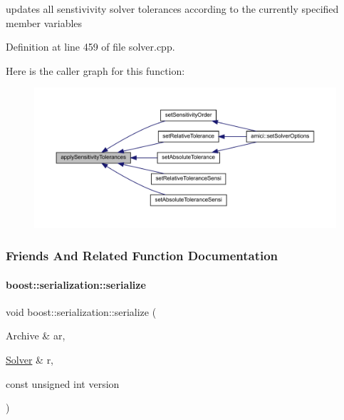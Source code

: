 updates all senstivivity solver tolerances according to the currently specified member variables 

Definition at line 459 of file solver.\+cpp.

Here is the caller graph for this function\+:
\nopagebreak
\begin{figure}[H]
\begin{center}
\leavevmode
\includegraphics[width=350pt]{classamici_1_1_solver_a2d93ff630e5bb38f4bc6d8b47b46bd73_icgraph}
\end{center}
\end{figure}


\subsubsection{Friends And Related Function Documentation}
\mbox{\label{classamici_1_1_solver_af5aefbc0a968aeae501d6d7f753ee2a4}} 
\paragraph{\texorpdfstring{boost\+::serialization\+::serialize}{boost::serialization::serialize}}
{\footnotesize\ttfamily void boost\+::serialization\+::serialize (\begin{DoxyParamCaption}\item[{Archive \&}]{ar,  }\item[{\mbox{\hyperlink{classamici_1_1_solver}{Solver}} \&}]{r,  }\item[{const unsigned int}]{version }\end{DoxyParamCaption})\hspace{0.3cm}{\ttfamily [friend]}}


